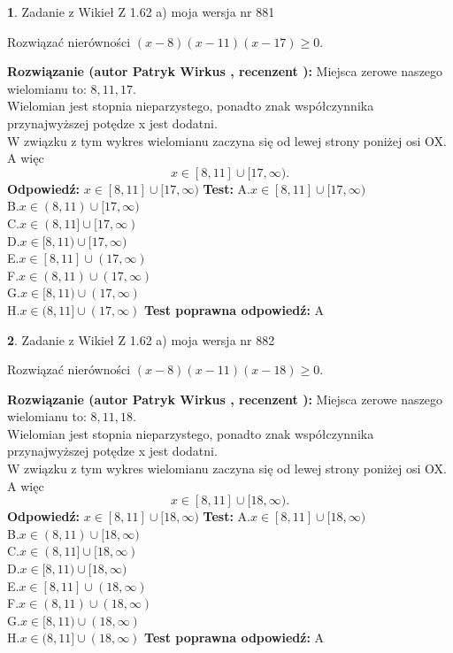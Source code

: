\documentclass[12pt, a4paper]{article}
\theoremstyle{definition} %
\newtheorem{zad}{}
\newcommand{\zadStart}[1]{\begin{zad}#1\newline}
\newcommand{\zadStop}{\end{zad}}
\newcommand{\rozwStart}[2]{\noindent \textbf{Rozwiązanie (autor #1 , recenzent #2): }\newline}
\newcommand{\rozwStop}{\newline}
\newcommand{\odpStart}{\noindent \textbf{Odpowiedź:}\newline}
\newcommand{\odpStop}{\newline}
\newcommand{\testStart}{\noindent \textbf{Test:}\newline}
\newcommand{\testStop}{\newline}
\newcommand{\kluczStart}{\noindent \textbf{Test poprawna odpowiedź:}\newline}
\newcommand{\kluczStop}{\newline}
\begin{document}
\zadStart{Zadanie z Wikieł Z 1.62 a) moja wersja nr 881}

Rozwiązać nierówności $(x-8)(x-11)(x-17)\ge0$.
\zadStop
\rozwStart{Patryk Wirkus}{}
Miejsca zerowe naszego wielomianu to: $8, 11, 17$.\\
Wielomian jest stopnia nieparzystego, ponadto znak współczynnika przy\linebreak najwyższej potędze x jest dodatni.\\ W związku z tym wykres wielomianu zaczyna się od lewej strony poniżej osi OX. A więc $$x \in [8,11] \cup [17,\infty).$$
\rozwStop
\odpStart
$x \in [8,11] \cup [17,\infty)$
\odpStop
\testStart
A.$x \in [8,11] \cup [17,\infty)$\\
B.$x \in (8,11) \cup [17,\infty)$\\
C.$x \in (8,11] \cup [17,\infty)$\\
D.$x \in [8,11) \cup [17,\infty)$\\
E.$x \in [8,11] \cup (17,\infty)$\\
F.$x \in (8,11) \cup (17,\infty)$\\
G.$x \in [8,11) \cup (17,\infty)$\\
H.$x \in (8,11] \cup (17,\infty)$
\testStop
\kluczStart
A
\kluczStop



\zadStart{Zadanie z Wikieł Z 1.62 a) moja wersja nr 882}

Rozwiązać nierówności $(x-8)(x-11)(x-18)\ge0$.
\zadStop
\rozwStart{Patryk Wirkus}{}
Miejsca zerowe naszego wielomianu to: $8, 11, 18$.\\
Wielomian jest stopnia nieparzystego, ponadto znak współczynnika przy\linebreak najwyższej potędze x jest dodatni.\\ W związku z tym wykres wielomianu zaczyna się od lewej strony poniżej osi OX. A więc $$x \in [8,11] \cup [18,\infty).$$
\rozwStop
\odpStart
$x \in [8,11] \cup [18,\infty)$
\odpStop
\testStart
A.$x \in [8,11] \cup [18,\infty)$\\
B.$x \in (8,11) \cup [18,\infty)$\\
C.$x \in (8,11] \cup [18,\infty)$\\
D.$x \in [8,11) \cup [18,\infty)$\\
E.$x \in [8,11] \cup (18,\infty)$\\
F.$x \in (8,11) \cup (18,\infty)$\\
G.$x \in [8,11) \cup (18,\infty)$\\
H.$x \in (8,11] \cup (18,\infty)$
\testStop
\kluczStart
A
\kluczStop
\end{document}

